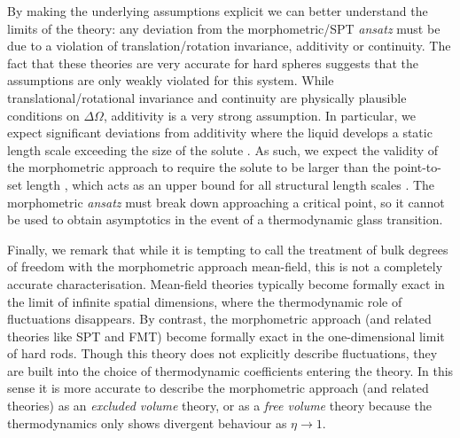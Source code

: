 \documentclass[11pt,twoside]{report}
\def\includebibliography{}
\begin{document}
By making the underlying assumptions explicit we can better understand the limits of the theory: any deviation from the morphometric/SPT \emph{ansatz} must be due to a violation of translation/rotation invariance, additivity or continuity.
The fact that these theories are very accurate for hard spheres suggests that the assumptions are only weakly violated for this system.
While translational/rotational invariance and continuity are physically plausible conditions on $\Delta \Omega$, additivity is a very strong assumption.
In particular, we expect significant deviations from additivity where the liquid develops a static length scale exceeding the size of the solute \cite{KonigPRL2004}.
As such, we expect the validity of the morphometric approach to require the solute to be larger than the point-to-set length \cite{MontanariJSP2006}, which acts as an upper bound for all structural length scales \cite{YaidaPRE2016}.
The morphometric \emph{ansatz} must break down approaching a critical point, so it cannot be used to obtain asymptotics in the event of a thermodynamic glass transition.

Finally, we remark that while it is tempting to call the treatment of bulk degrees of freedom with the morphometric approach mean-field, this is not a completely accurate characterisation.
Mean-field theories typically become formally exact in the limit of infinite spatial dimensions, where the thermodynamic role of fluctuations disappears.
By contrast, the morphometric approach (and related theories like SPT and FMT) become formally exact in the one-dimensional limit of hard rods.
Though this theory does not explicitly describe fluctuations, they are built into the choice of thermodynamic coefficients entering the theory.
In this sense it is more accurate to describe the morphometric approach (and related theories) as an \emph{excluded volume} theory, or as a \emph{free volume} theory because the thermodynamics only shows divergent behaviour as $\eta \to 1$.


\ifdefined\includebibliography
  \printbibliography
\fi
\end{document}
